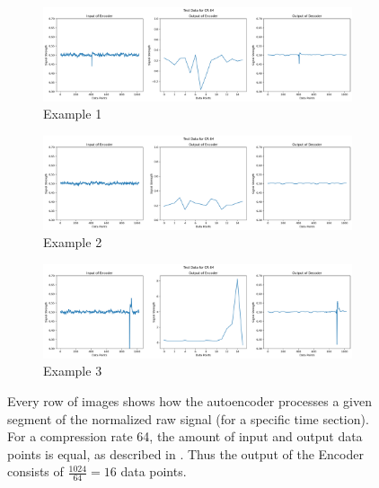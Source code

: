 \begin{figure}[h]
	\centering
	\begin{subfigure}[b]{\textwidth} 
		\centering
		\includegraphics[width=\textwidth]{../../Images/EncodedDecodedCR64_1.png}
		\caption{Example 1}
		\label{fig:OriginalEncodedDecoded1}
	\end{subfigure}
	\begin{subfigure}[b]{\textwidth} 
	\centering
	\includegraphics[width=\textwidth]{../../Images/EncodedDecodedCR64_2.png}
	\caption{Example 2}
	\label{fig:OriginalEncodedDecoded2}
	\end{subfigure}
	\begin{subfigure}[b]{\textwidth} 
	\centering
	\includegraphics[width=\textwidth]{../../Images/EncodedDecodedCR64_3.png}
	\caption{Example 3}
	\label{fig:OriginalEncodedDecoded3}
	\end{subfigure}
	\caption{
		Every row of images shows how the autoencoder processes a given segment of the normalized raw signal (for a specific time section).
		For a compression rate 64, the amount of input and output data points is equal, as described in . Thus the output of the Encoder consists of $\frac{1024}{64} = 16$ data points. 		
	}
	\label{fig:OriginalEncodedDecoded}
\end{figure}
\FloatBarrier


